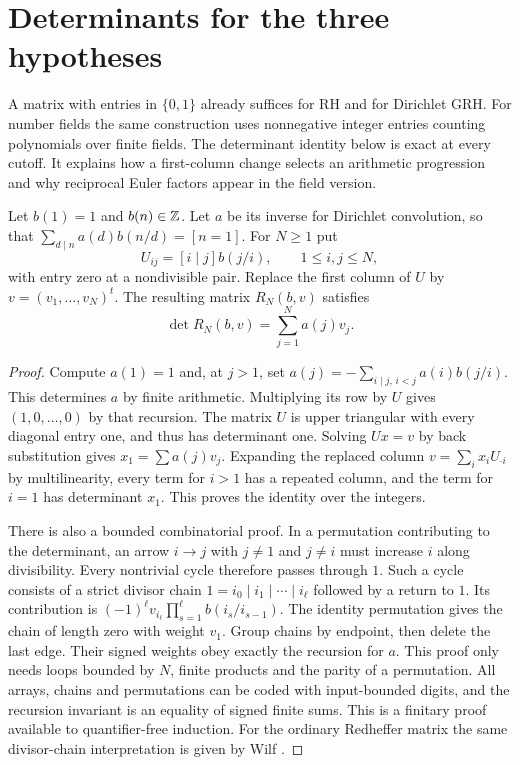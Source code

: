 \section{Determinants for the three hypotheses}\label{sec:matrices}
A matrix with entries in $\{0,1\}$ already suffices for RH and for Dirichlet GRH. For number fields the same construction uses nonnegative integer entries counting polynomials over finite fields. The determinant identity below is exact at every cutoff. It explains how a first-column change selects an arithmetic progression and why reciprocal Euler factors appear in the field version.

\begin{theorem}\label{thm:matrix}
Let $b(1)=1$ and $b(n)\in\mathbb Z$. Let $a$ be its inverse for Dirichlet convolution, so that $\sum_{d\mid n}a(d)b(n/d)=[n=1]$. For $N\ge1$ put
\[
 U_{ij}=[i\mid j]b(j/i),\qquad 1\le i,j\le N,
\]
with entry zero at a nondivisible pair. Replace the first column of $U$ by $v=(v_1,\ldots,v_N)^t$. The resulting matrix $R_N(b,v)$ satisfies
\[
                 \det R_N(b,v)=\sum_{j=1}^N a(j)v_j .
\]
\end{theorem}
\begin{proof}
Compute $a(1)=1$ and, at $j>1$, set $a(j)=-\sum_{i\mid j,\,i<j}a(i)b(j/i)$. This determines $a$ by finite arithmetic. Multiplying its row by $U$ gives $(1,0,\ldots,0)$ by that recursion. The matrix $U$ is upper triangular with every diagonal entry one, and thus has determinant one. Solving $Ux=v$ by back substitution gives $x_1=\sum a(j)v_j$. Expanding the replaced column $v=\sum_i x_i U_{\cdot i}$ by multilinearity, every term for $i>1$ has a repeated column, and the term for $i=1$ has determinant $x_1$. This proves the identity over the integers.

There is also a bounded combinatorial proof. In a permutation contributing to the determinant, an arrow $i\to j$ with $j\ne1$ and $j\ne i$ must increase $i$ along divisibility. Every nontrivial cycle therefore passes through $1$. Such a cycle consists of a strict divisor chain $1=i_0\mid i_1\mid\cdots\mid i_\ell$ followed by a return to $1$. Its contribution is $(-1)^\ell v_{i_\ell}\prod_{s=1}^\ell b(i_s/i_{s-1})$. The identity permutation gives the chain of length zero with weight $v_1$. Group chains by endpoint, then delete the last edge. Their signed weights obey exactly the recursion for $a$. This proof only needs loops bounded by $N$, finite products and the parity of a permutation. All arrays, chains and permutations can be coded with input-bounded digits, and the recursion invariant is an equality of signed finite sums. This is a finitary proof available to quantifier-free induction. For the ordinary Redheffer matrix the same divisor-chain interpretation is given by Wilf \cite{wilf}.
\end{proof}

